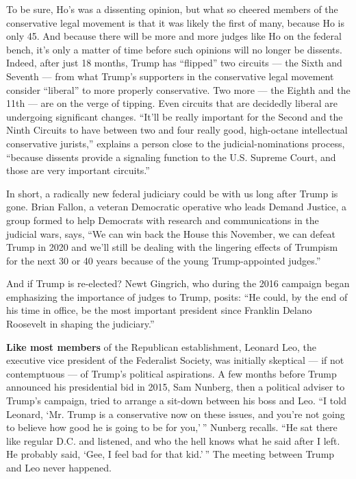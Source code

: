 To be sure, Ho's was a dissenting opinion, but what so cheered members
of the conservative legal movement is that it was likely the first of
many, because Ho is only 45. And because there will be more and more
judges like Ho on the federal bench, it's only a matter of time before
such opinions will no longer be dissents. Indeed, after just 18 months,
Trump has ``flipped'' two circuits --- the Sixth and Seventh --- from
what Trump's supporters in the conservative legal movement consider
``liberal'' to more properly conservative. Two more --- the Eighth and
the 11th --- are on the verge of tipping. Even circuits that are
decidedly liberal are undergoing significant changes. ``It'll be really
important for the Second and the Ninth Circuits to have between two and
four really good, high-octane intellectual conservative jurists,''
explains a person close to the judicial-nominations process, ``because
dissents provide a signaling function to the U.S. Supreme Court, and
those are very important circuits.''

In short, a radically new federal judiciary could be with us long after
Trump is gone. Brian Fallon, a veteran Democratic operative who leads
Demand Justice, a group formed to help Democrats with research and
communications in the judicial wars, says, ``We can win back the House
this November, we can defeat Trump in 2020 and we'll still be dealing
with the lingering effects of Trumpism for the next 30 or 40 years
because of the young Trump-appointed judges.''

And if Trump is re-elected? Newt Gingrich, who during the 2016 campaign
began emphasizing the importance of judges to Trump, posits: ``He could,
by the end of his time in office, be the most important president since
Franklin Delano Roosevelt in shaping the judiciary.''

\textbf{Like most members} of the Republican establishment, Leonard Leo,
the executive vice president of the Federalist Society, was initially
skeptical --- if not contemptuous --- of Trump's political aspirations.
A few months before Trump announced his presidential bid in 2015, Sam
Nunberg, then a political adviser to Trump's campaign, tried to arrange
a sit-down between his boss and Leo. ``I told Leonard, `Mr. Trump is a
conservative now on these issues, and you're not going to believe how
good he is going to be for you,' '' Nunberg recalls. ``He sat there like
regular D.C. and listened, and who the hell knows what he said after I
left. He probably said, `Gee, I feel bad for that kid.' '' The meeting
between Trump and Leo never happened.

